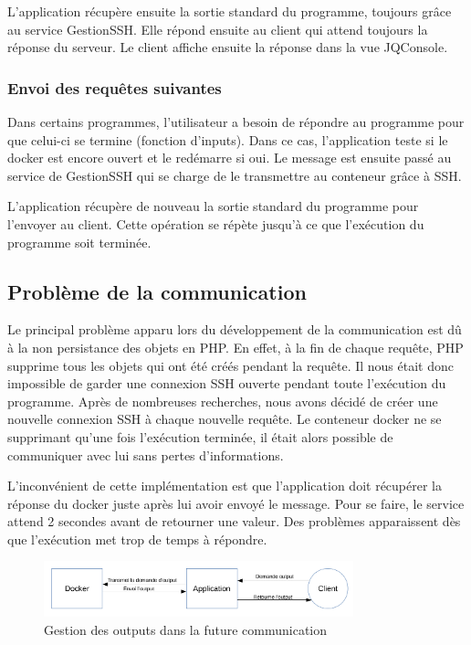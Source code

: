 \par L'application récupère ensuite la sortie standard du programme, toujours grâce au service GestionSSH. Elle répond ensuite au client qui attend toujours la réponse du serveur. Le client affiche ensuite la réponse dans la vue JQConsole.

\subsubsection{Envoi des requêtes suivantes}

\par Dans certains programmes, l'utilisateur a besoin de répondre au programme pour que celui-ci se termine (fonction d'inputs). Dans ce cas, l'application teste si le docker est encore ouvert et le redémarre si oui. Le message est ensuite passé au service de GestionSSH qui se charge de le transmettre au conteneur grâce à SSH.

\par L'application récupère de nouveau la sortie standard du programme pour l'envoyer au client. Cette opération se répète jusqu'à ce que l'exécution du programme soit terminée.

\subsection{Problème de la communication}

\par Le principal problème apparu lors du développement de la communication est dû à la non persistance des objets en PHP. En effet, à la fin de chaque requête, PHP supprime tous les objets qui ont été créés pendant la requête. Il nous était donc impossible de garder une connexion SSH ouverte pendant toute l'exécution du programme. Après de nombreuses recherches, nous avons décidé de créer une nouvelle connexion SSH à chaque nouvelle requête. Le conteneur docker ne se supprimant qu'une fois l'exécution terminée, il était alors possible de communiquer avec lui sans pertes d'informations.

\par L'inconvénient de cette implémentation est que l'application doit récupérer la réponse du docker juste après lui avoir envoyé le message. Pour se faire, le service attend 2 secondes avant de retourner une valeur. Des problèmes apparaissent dès que l'exécution met trop de temps à répondre.

\begin{figure}[H]
\centering
\includegraphics[width=0.8\textwidth]{./img/communication/newcomoutput.png}
\caption{Gestion des outputs dans la future communication}
\end{figure}

